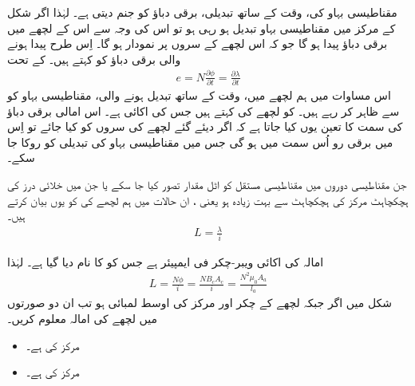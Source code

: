 مقناطیسی بہاو کی، وقت کے ساتھ تبدیلی، برقی دباؤ  کو جنم دیتی ہے۔ لہٰذا  اگر شکل   کے مرکز میں مقناطیسی بہاو تبدیل ہو رہی ہو تو اس کی وجہ سے اس کے لچھے میں برقی دباؤ پیدا ہو گا جو کہ اس لچھے کے سروں پر نمودار ہو گا۔ اِس طرح پیدا ہونے والی برقی دباؤ کو   کہتے ہیں۔   کے تحت
\begin{align}\label{مساوات_مقناطیسی_دور_فیراڈے_قانون}
e=N \frac{\partial \phi}{\partial t} =\frac{\partial \lambda}{\partial t}
\end{align}
اس مساوات میں ہم لچھے میں، وقت کے ساتھ تبدیل ہونے والی، مقناطیسی بہاو کو  سے ظاہر کر رہے ہیں۔ کو لچھے کی    کہتے ہیں جس کی اکائی   ہے۔ اس امالی برقی دباؤ  کی سمت کا تعین یوں کیا جاتا ہے کہ اگر دیئے گئے لچھے کی سروں کو    کیا جائے تو اِس میں برقی رو اُس سمت میں ہو گی جس میں مقناطیسی بہاو کی تبدیلی کو روکا جا سکے۔ 

جن مقناطیسی دوروں میں مقناطیسی مستقل   کو اٹل مقدار تصور کیا جا سکے یا جن میں خلائی درز کی ہچکچاہٹ مرکز کی ہچکچاہٹ سے بہت زیادہ ہو یعنی  ، ان حالات میں ہم لچھے کی     کو یوں بیان کرتے ہیں۔
\begin{align}\label{مساوات_مقناطیسی_دور_خود_امالہ_تعریف}
L=\frac{\lambda}{i}
\end{align}

امالہ کی اکائی ویبر-چکر فی ایمپیئر ہے جس کو   کا نام دیا گیا ہے۔ لہٰذا
\begin{align}
L=\frac{N \phi}{i}=\frac{N B_c A_c}{i}=\frac{N^2 \mu_0 A_a}{l_a}
\end{align}
%
شکل  میں اگر  جبکہ لچھے کے  چکر اور مرکز کی اوسط لمبائی  ہو تب ان دو صورتوں میں لچھے کی امالہ معلوم کریں۔
\begin{itemize}
\item
مرکز کی  ہے۔
\item
مرکز کی  ہے۔
\end{itemize}


